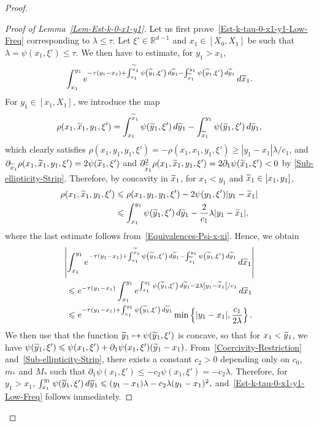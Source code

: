 \documentclass[10pt]{amsart}
\theoremstyle{definition}\newtheorem{defi}[theo]{Definition}\newtheorem{rema}[theo]{Remark}\newtheorem{exam}[theo]{Example}\newtheorem{exem}[theo]{Example}\newtheorem{nota}[theo]{Notation}
\newcommand*\R{\mathbb{R}}
\renewcommand{\leq}{\leqslant}
\renewcommand{\geq}{\geqslant}
\renewcommand{\tilde}{\widetilde}
\let\oldtilde\tilde
\renewcommand*{\tilde}[1]{\mathchoice{\widetilde{#1}}{\widetilde{#1}}{\oldtilde{#1}}{\oldtilde{#1}}}
\begin{document}
\begin{proof}
\begin{proof}[Proof of Lemma~\ref{Lem-Est-k-0-x1-y1}]
Let us first prove~\eqref{Est-k-tau-0-x1-y1-Low-Freq} corresponding to $\lambda \leq \tau$. Let $\xi' \in \R^{d-1}$ and $x_1 \in [X_0, X_1]$ be such that $\lambda = \psi(x_1,\xi') \leq \tau$. We then have to estimate, for $y_1 > x_1$,
\[
\int_{x_1}^{y_1} e^{-\tau (y_1-x_1)+\int_{x_1}^{ \tilde{x}_1} \psi\left(\tilde{y}_1,\xi'\right) \, d \tilde{y}_1- \int_{{\tilde{x}_1}}^{y_1} \psi\left(\tilde{y}_1,\xi'\right) \, d \tilde{y}_1} \, d \tilde{x}_1.
\]
For $ y_1 \in [x_1, X_1]$, we introduce the map
\[
\rho(x_1,\tilde x_1, y_1,\xi') =
\int_{x_1}^{\tilde{x}_1} \psi(\tilde{y}_1,\xi') \, d \tilde{y}_1 -
\int_{{\tilde{x}_1}}^{y_1} \psi(\tilde{y}_1,\xi') \,d \tilde{y}_1,
\]
which clearly satisfies $\rho(x_1,y_1, y_1, \xi') = - \rho(x_1,x_1,y_1, \xi') \geq |y_1 - x_1| \lambda /c_1$, and \\ $\partial_{\tilde x_1} \rho(x_1, \tilde x_1, y_1, \xi') = 2 \psi(\tilde x_1, \xi')$ and $\partial_{\tilde x_1}^2 \rho(x_1, \tilde x_1, y_1, \xi') = 2 \partial_1 \psi(\tilde x_1, \xi') <0$ by \eqref{Sub-ellipticity-Strip}. Therefore, by concavity in $\tilde x_1$, for $x_1 < y_1$ and $\tilde x_1 \in [x_1, y_1]$,
\begin{align*}
\rho(x_1, \tilde x_1, y_1, \xi')
&\leq \rho(x_1,y_1,y_1, \xi') - 2 \psi(y_1,\xi') |y_1 - \tilde x_1|\\
&\leq \int_{x_1}^{y_1} \psi(\tilde{y}_1,\xi') \, d \tilde{y}_1- \frac{2}{c_1} \lambda |y_1 - \tilde x_1|,
\end{align*}
where the last estimate follows from~\eqref{Equivalences-Psi-x-xi}. Hence, we obtain
\begin{multline*}
\left|
\int_{x_1}^{y_1} e^{-\tau (y_1-x_1)+\int_{x_1}^{ \tilde{x}_1} \psi\left(\tilde{y}_1,\xi'\right) \, d \tilde{y}_1- \int_{{\tilde{x}_1}}^{y_1} \psi\left(\tilde{y}_1,\xi'\right) \, d \tilde{y}_1} \, d \tilde{x}_1
\right|
\\
\begin{aligned}
&\leq e^{-\tau (y_1-x_1)} \int_{x_1}^{y_1} e^{\int_{x_1}^{y_1} \psi\left(\tilde{y}_1,\xi'\right) \, d \tilde{y}_1- {2} \lambda \left|y_1 - \tilde x_1\right|/{c_1}}
\, d \tilde{x}_1
\\
&\leq e^{-\tau(y_1 - x_1) + \int_{x_1}^{y_1} \psi\left(\tilde{y}_1,\xi'\right) \, d \tilde{y}_1} \min\left\{ |y_1 - x_1|, \frac{c_1}{2 \lambda}\right\}.
\end{aligned}
\end{multline*}
We then use that the function $\tilde y_1 \mapsto \psi(\tilde y_1, \xi') $ is concave, so that for $x_1 < \tilde y_1$, we have $\psi(\tilde y_1, \xi') \leq \psi(x_1, \xi') + \partial_1 \psi(x_1, \xi') (\tilde y_1 -x_1)$. From~\eqref{Coercivity-Restriction} and~\eqref{Sub-ellipticity-Strip}, there exists a constant $c_2>0$ depending only on $c_0$, $m_*$ and $M_*$ such that $\partial_1 \psi(x_1, \xi') \leq - c_2 \psi(x_1, \xi') = - c_2 \lambda$. Therefore, for $y_1 > x_1$, $
\int_{x_1}^{y_1} \psi(\tilde{y}_1,\xi') \, d \tilde{y}_1
\leq (y_1 -x_1) \lambda - c_2 \lambda (y_1 -x_1)^2, $ and~\eqref{Est-k-tau-0-x1-y1-Low-Freq} follows immediately.



\end{proof}
\end{proof}
\end{document}
